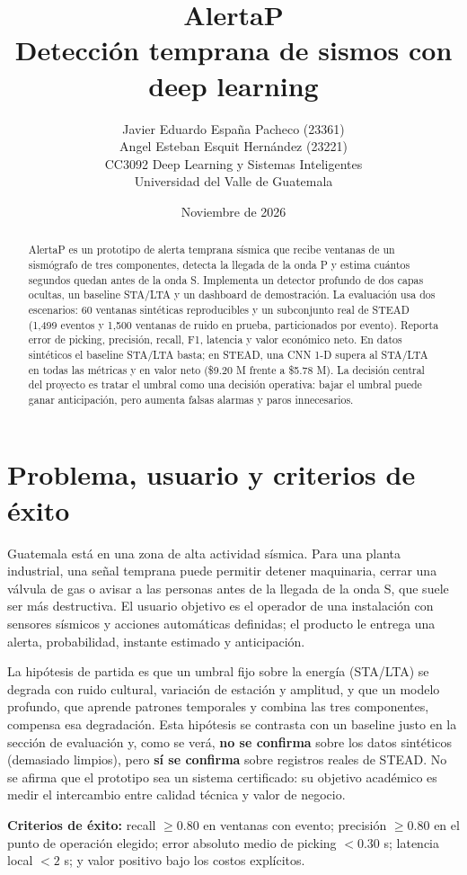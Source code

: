 \documentclass[11pt,letterpaper]{article}
\title{\textbf{AlertaP}\\\large Detección temprana de sismos con deep learning}
\author{Javier Eduardo España Pacheco (23361)\\Angel Esteban Esquit Hernández (23221)\\
CC3092 Deep Learning y Sistemas Inteligentes\\Universidad del Valle de Guatemala}
\date{Noviembre de 2026}
\begin{document}
\maketitle
\begin{abstract}
AlertaP es un prototipo de alerta temprana sísmica que recibe ventanas de un
sismógrafo de tres componentes, detecta la llegada de la onda P y estima cuántos
segundos quedan antes de la onda S. Implementa un detector profundo de dos capas
ocultas, un baseline STA/LTA y un dashboard de demostración. La evaluación usa
dos escenarios: 60 ventanas sintéticas reproducibles y un subconjunto real de STEAD
(1,499 eventos y 1,500 ventanas de ruido en prueba, particionados por evento).
Reporta error de picking, precisión, recall, F1, latencia y valor económico neto.
En datos sintéticos el baseline STA/LTA basta; en STEAD, una CNN 1-D supera al
STA/LTA en todas las métricas y en valor neto (\$9.20 M frente a \$5.78 M). La decisión central del
proyecto es tratar el umbral como una decisión operativa: bajar el umbral puede
ganar anticipación, pero aumenta falsas alarmas y paros innecesarios.
\end{abstract}

\section{Problema, usuario y criterios de éxito}
Guatemala está en una zona de alta actividad sísmica. Para una planta industrial,
una señal temprana puede permitir detener maquinaria, cerrar una válvula de gas o
avisar a las personas antes de la llegada de la onda S, que suele ser más
destructiva. El usuario objetivo es el operador de una instalación con sensores
sísmicos y acciones automáticas definidas; el producto le entrega una alerta,
probabilidad, instante estimado y anticipación.

La hipótesis de partida es que un umbral fijo sobre la energía (STA/LTA) se
degrada con ruido cultural, variación de estación y amplitud, y que un modelo
profundo, que aprende patrones temporales y combina las tres componentes,
compensa esa degradación. Esta hipótesis se contrasta con un baseline justo en la
sección de evaluación y, como se verá, \textbf{no se confirma} sobre los datos
sintéticos (demasiado limpios), pero \textbf{sí se confirma} sobre registros reales
de STEAD. No se afirma que el prototipo sea un sistema certificado: su
objetivo académico es medir el intercambio entre calidad técnica y valor de
negocio.

\textbf{Criterios de éxito:} recall $\geq 0.80$ en ventanas con evento; precisión
$\geq 0.80$ en el punto de operación elegido; error absoluto medio de picking
$<0.30$ s; latencia local $<2$ s; y valor positivo bajo los costos explícitos.
\end{document}
